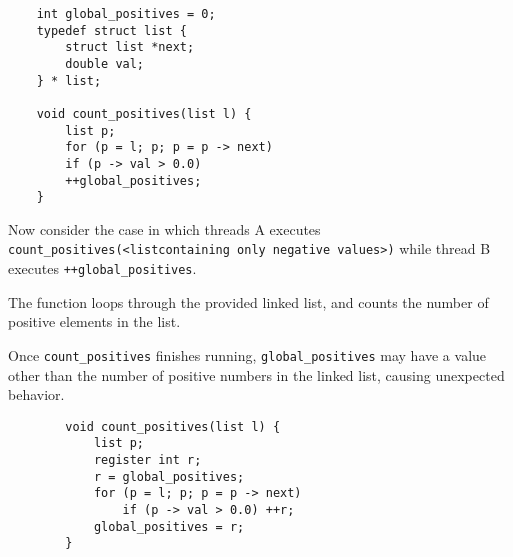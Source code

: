 \documentclass[12pt,largemargins]{homework}
\newcommand{\code}{\texttt}
\begin{document}
\maketitle


\begin{verbatim}
    int global_positives = 0;
    typedef struct list {
        struct list *next;
        double val;
    } * list;

    void count_positives(list l) {
        list p;
        for (p = l; p; p = p -> next)
        if (p -> val > 0.0)
        ++global_positives;
    }
    \end{verbatim}

Now consider the case in which threads A executes
\code{count\_positives(<listcontaining only negative values>)}
while thread B executes \code{++global\_positives}.

\begin{alphaparts}

    The function loops through the provided linked list, and counts the
    number of positive elements in the list.


    Once \code{count\_positives} finishes running, \code{global\_positives} may
    have a value other than the number of positive numbers in the linked list,
    causing unexpected behavior.
\end{alphaparts}

\clearpage
{}

\begin{verbatim}
        void count_positives(list l) { 
            list p; 
            register int r; 
            r = global_positives; 
            for (p = l; p; p = p -> next) 
                if (p -> val > 0.0) ++r; 
            global_positives = r; 
        }
    \end{verbatim}
\end{document}
